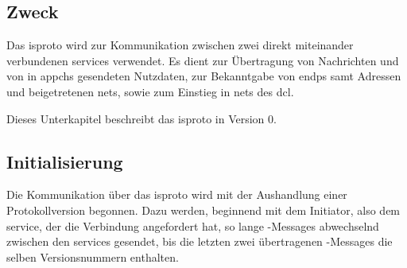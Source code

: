 
\subsection{Zweck}
Das \gls{isproto} wird zur Kommunikation zwischen zwei direkt miteinander verbundenen \glspl{service}
verwendet. Es dient zur Übertragung von Nachrichten und von in \glspl{appch} gesendeten Nutzdaten,
zur Bekanntgabe von \glspl{endp} samt Adressen und beigetretenen \glspl{net}, sowie zum Einstieg in
\glspl{net} des \gls{dcl}.

Dieses Unterkapitel beschreibt das \gls{isproto} in Version 0.

\subsection{Initialisierung}
Die Kommunikation über das \gls{isproto} wird mit der Aushandlung einer Protokollversion begonnen.
Dazu werden, beginnend mit dem Initiator, also dem \gls{service}, der die Verbindung angefordert hat,
so lange \isprotoversion-Messages abwechselnd zwischen den \glspl{service} gesendet, bis die letzten
zwei übertragenen \isprotoversion-Messages die selben Versionsnummern enthalten.

%

